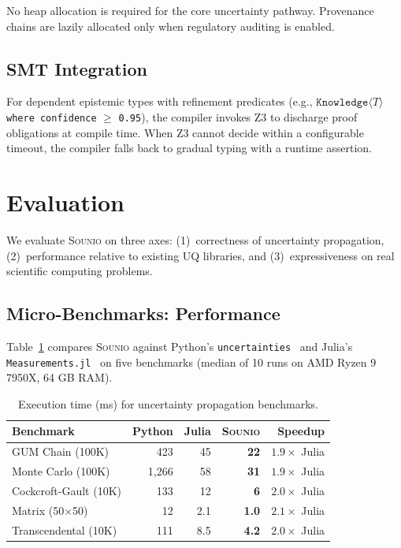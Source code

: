 \documentclass[acmsmall,screen,review,anonymous]{acmart}
\newcommand{\sounio}{\textsc{Sounio}\xspace}
\newcommand{\know}[1]{\texttt{Knowledge}\langle #1 \rangle}
\begin{document}
\noindent
No heap allocation is required for the core uncertainty pathway.
Provenance chains are lazily allocated only when regulatory
auditing is enabled.

\subsection{SMT Integration}

For dependent epistemic types with refinement predicates
(e.g., $\know{T}$ \texttt{where confidence} $\geq$ \texttt{0.95}),
the compiler invokes Z3 to discharge proof obligations at compile time.
When Z3 cannot decide within a configurable timeout, the compiler
falls back to gradual typing with a runtime assertion.

\section{Evaluation}
\label{sec:evaluation}

We evaluate \sounio on three axes:
(1)~correctness of uncertainty propagation,
(2)~performance relative to existing UQ libraries, and
(3)~expressiveness on real scientific computing problems.

\subsection{Micro-Benchmarks: Performance}

Table~\ref{tab:perf} compares \sounio against Python's
\texttt{uncertainties}~\cite{lebigot2024uncertainties} and Julia's
\texttt{Measurements.jl}~\cite{giordano2016measurements} on five
benchmarks (median of 10 runs on AMD Ryzen 9 7950X, 64 GB RAM).

\begin{table}[t]
\centering
\caption{Execution time (ms) for uncertainty propagation benchmarks.}
\label{tab:perf}
\begin{tabular}{lrrrr}
\toprule
Benchmark & Python & Julia & \sounio & Speedup \\
\midrule
GUM Chain (100K)       & 423   & 45   & \textbf{22}  & $1.9\times$ Julia \\
Monte Carlo (100K)     & 1{,}266 & 58 & \textbf{31}  & $1.9\times$ Julia \\
Cockcroft-Gault (10K)  & 133   & 12   & \textbf{6}   & $2.0\times$ Julia \\
Matrix (50$\times$50)  & 12    & 2.1  & \textbf{1.0} & $2.1\times$ Julia \\
Transcendental (10K)   & 111   & 8.5  & \textbf{4.2} & $2.0\times$ Julia \\
\bottomrule
\end{tabular}
\end{table}
\end{document}

